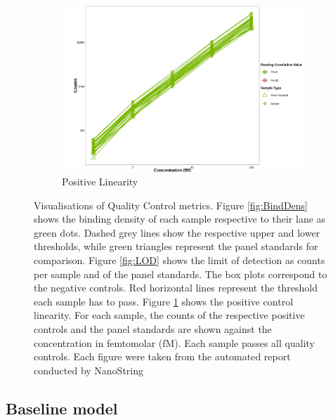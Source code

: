 \begin{figure}[h!t]
\begin{subfigure}[b]{0.475\textwidth}
         \includegraphics[width=\textwidth]{latex/figures/PositiveLinearity.png}
         \caption{Positive Linearity}
         \label{fig:PosLin}
     \end{subfigure}
    \hfill
    \caption[NanoString Quality Control]{Visualisations of Quality Control metrics. Figure \ref{fig:BindDens} shows the binding density of each sample respective to their lane as green dots. Dashed grey lines show the respective upper and lower thresholds, while green triangles represent the panel standards for comparison. Figure \ref{fig:LOD} shows the limit of detection as counts per sample and of the panel standards. The box plots correspond to the negative controls. Red horizontal lines represent the threshold each sample has to pass. Figure \ref{fig:PosLin} shows the positive control linearity. For each sample, the counts of the respective positive controls and the panel standards are shown against the concentration in femtomolar (fM). 
    Each sample passes all quality controls. Each figure were taken from the automated report conducted by NanoString \cite{Gorman2022IO}} 
    \label{fig:RCCQC}
\end{figure}


\subsection{Baseline model}

